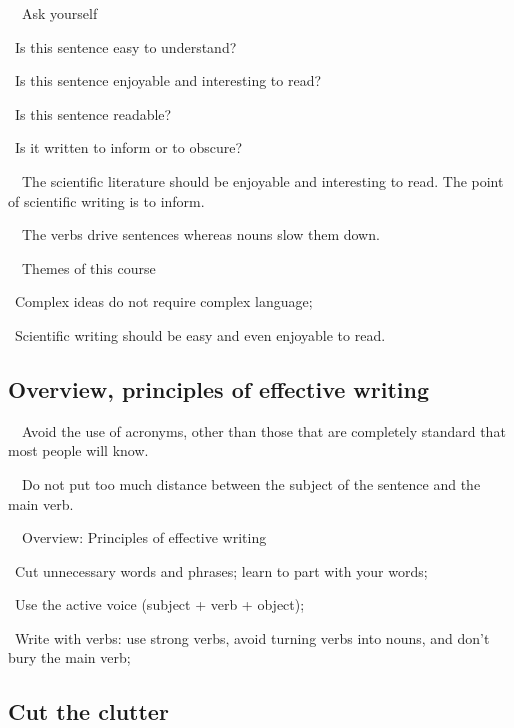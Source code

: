 \documentclass[a4paper, 12pt]{article}
\begin{document}
\par\ \textbullet\ Ask yourself
\par\quad\textopenbullet\ Is this sentence easy to understand?
\par\quad\textopenbullet\ Is this sentence enjoyable and interesting to read?
\par\quad\textopenbullet\ Is this sentence readable?
\par\quad\textopenbullet\ Is it written to inform or to obscure?

\par\ \textbullet\ The scientific literature should be enjoyable and interesting to read. The point of scientific writing is to inform.

\par\ \textbullet\ The verbs drive sentences whereas nouns slow them down.

\par\ \textbullet\ Themes of this course
\par\quad\textopenbullet\ Complex ideas do not require complex language;
\par\quad\textopenbullet\ Scientific writing should be easy and even enjoyable to read.

\subsection{Overview, principles of effective writing}

\par\ \textbullet\ Avoid the use of acronyms, other than those that are completely standard that most people will know.

\par\ \textbullet\ Do not put too much distance between the subject of the sentence and the main verb.

\par\ \textbullet\ Overview: Principles of effective writing
\par\quad\textopenbullet\ Cut unnecessary words and phrases; learn to part with your words;
\par\quad\textopenbullet\ Use the active voice (subject + verb + object);
\par\quad\textopenbullet\ Write with verbs: use strong verbs, avoid turning verbs into nouns, and don't bury the main verb;

\newpage\subsection{Cut the clutter}
\end{document}
